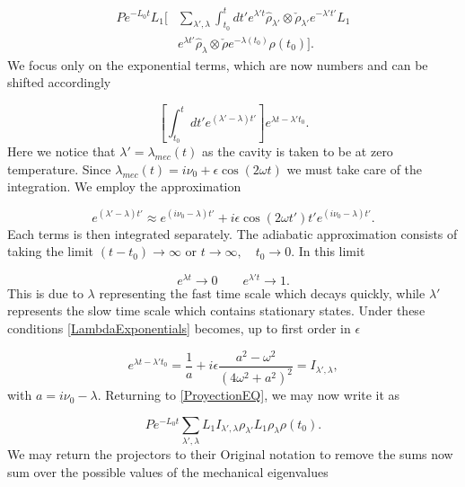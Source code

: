 \documentclass[reprint, amsmath,amssymb, aps,pra]{revtex4-1}
\begin{document}
\begin{align}\label{ProyectionEQ}
P e^{-L_0 t}L_1[&\sum_{\lambda',\lambda}\int_{t_0}^{t}dt'e^{\lambda' t} \hat{\rho}_{\lambda'} \otimes \check{\rho}_{\lambda'}e^{-\lambda' t'}L_1\\
&e^{\lambda t'}\hat{\rho}_\lambda \otimes \check{\rho}e^{-\lambda( t_0)}\rho(t_0)]\nonumber.
\end{align} We focus only on the exponential terms, which are now numbers and can be shifted accordingly

\begin{equation}\label{LambdaExponentials}
[\int_{t_0}^t dt' e^{(\lambda'-\lambda)t'}]e^{\lambda t- \lambda't_0}.
\end{equation} Here we notice that $\lambda' = \lambda_{mec}(t)$ as the cavity is taken to be at zero temperature. Since $\lambda_{mec}(t) = i\nu_0 + \epsilon \cos(2\omega t)$ we must take care of the integration. We employ the approximation

\begin{equation}
e^{(\lambda'-\lambda)t'} \approx e^{(i\nu_0-\lambda)t'} + i\epsilon \cos(2 \omega t')t' e^{(i\nu_0-\lambda)t'}.
\end{equation} Each terms is then integrated separately. The adiabatic approximation consists of taking the limit $(t-t_0) \to \infty$ or $t \to \infty, \quad t_0 \to 0$. In this limit

\begin{equation}
e^{\lambda t} \to 0 \qquad e^{\lambda' t} \to 1.
\end{equation} This is due to $\lambda$ representing the fast time scale which decays quickly, while $\lambda'$ represents the slow time scale which contains stationary states. Under these conditions \eqref{LambdaExponentials} becomes, up to first order in $\epsilon$

\begin{equation}
[\int_{t_0}^t dt' e^{(\lambda'-\lambda)t'}]e^{\lambda t- \lambda't_0} = \frac{1}{a} + i\epsilon \frac{a^2 - \omega^2}{(4\omega^2 + a^2)^2} = I_{\lambda',\lambda},
\end{equation} with $a = i\nu_0 - \lambda$. Returning to \eqref{ProyectionEQ}, we may now write it as

\begin{equation}
Pe^{-L_0 t} \sum_{\lambda',\lambda} L_1 I_{\lambda',\lambda} \rho_{\lambda'} L_1 \rho_\lambda \rho(t_0).
\end{equation} We may return the projectors to their Original notation to remove the sums now sum over the possible values of the mechanical eigenvalues
\end{document}
